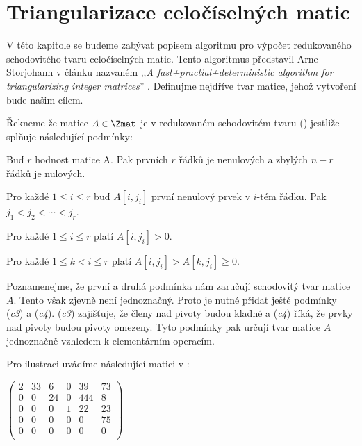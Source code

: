 \chapter{Triangularizace celočíselných matic}

V této kapitole se budeme zabývat popisem algoritmu pro výpočet redukovaného
schodovitého tvaru celočíselných matic. Tento algoritmus představil Arne Storjohann
v článku nazvaném ,,\textit{A fast+practial+deterministic algorithm for
triangularizing integer matrices}'' \cite{triang}. Definujme nejdříve tvar matice,
jehož vytvoření bude našim cílem.

\begin{defi}\label{RREF}
    Řekneme že matice $ A \in \Zmat $ je v redukovaném schodovitém tvaru (\rst) jestliže
    splňuje následující podmínky:
    \begin{Cond}
        \item Buď $ r $ hodnost matice A. Pak prvních $ r $ řádků je nenulových
        a zbylých $ n - r $ řádků je nulových.
        \item Pro každé $ 1 \leq i \leq r $ buď $A[i, j_i]$ první nenulový prvek v
        $ i $-tém řádku. Pak $ j_1 < j_2 < \cdots < j_r $.
        \item Pro každé $ 1 \leq i \leq r $ platí $ A[i, j_i] > 0 $.
        \item Pro každé $ 1 \leq k < i \leq r $ platí $ A[i, j_i] > A[k, j_i] \geq 0 $.
    \end{Cond}
\end{defi}

\begin{pozn}
Poznamenejme, že první a druhá podmínka nám zaručují schodovitý tvar matice $ A $.
Tento však zjevně není jednoznačný. Proto je nutné přidat ještě podmínky
(\textit{c3}) a (\textit{c4}). (\textit{c3}) zajišťuje, že členy nad pivoty budou
kladné a (\textit{c4}) říká, že prvky nad pivoty budou pivoty omezeny. Tyto
podmínky pak určují tvar matice $ A $ jednoznačně vzhledem k elementárním
operacím.
\end{pozn}

\begin{pri}
Pro ilustraci uvádíme následující matici v \rst:
\begin{center}
$
    \begin{pmatrix}
        2 & 33 & 6  & 0 & 39  & 73 \\
        0 & 0  & 24 & 0 & 444 & 8  \\
        0 & 0  & 0  & 1 & 22  & 23 \\
        0 & 0  & 0  & 0 & 0   & 75 \\
        0 & 0  & 0  & 0 & 0   & 0  \\
    \end{pmatrix}
$
\end{center}
\end{pri}

